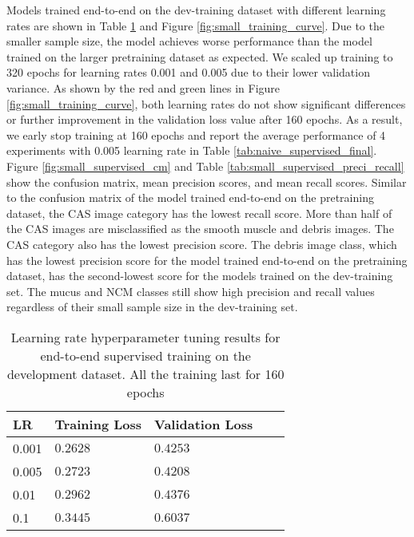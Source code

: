\documentclass[12pt,twoside]{report}
\begin{document}
Models trained end-to-end on the dev-training dataset with different learning rates are shown in Table \ref{tab:small_supervised_tuning} and Figure \ref{fig:small_training_curve}. Due to the smaller sample size, the model achieves worse performance than the model trained on the larger pretraining dataset as expected. We scaled up training to 320 epochs for learning rates 0.001 and 0.005 due to their lower validation variance. As shown by the red and green lines in Figure \ref{fig:small_training_curve}, both learning rates do not show significant differences or further improvement in the validation loss value after 160 epochs. As a result, we early stop training at 160 epochs and report the average performance of 4 experiments with 0.005 learning rate in Table \ref{tab:naive_supervised_final}. \\

Figure \ref{fig:small_supervised_cm} and Table \ref{tab:small_supervised_preci_recall} show the confusion matrix, mean precision scores, and mean recall scores. Similar to the confusion matrix of the model trained end-to-end on the pretraining dataset, the CAS image category has the lowest recall score. More than half of the CAS images are misclassified as the smooth muscle and debris images. The CAS category also has the lowest precision score. The debris image class, which has the lowest precision score for the model trained end-to-end on the pretraining dataset, has the second-lowest score for the models trained on the dev-training set. The mucus and NCM classes still show high precision and recall values regardless of their small sample size in the dev-training set.\\

\begin{table}[]
    \centering
    \begin{tabular}{lllll}
    \toprule
    LR & Training Loss & Validation Loss \\
    \midrule
    0.001 & $0.2628$ & $0.4253$ \\
    0.005 & $0.2723$ & $0.4208$ \\
    0.01  & $0.2962$ & $0.4376$ \\
    0.1   & $0.3445$ & $0.6037$ \\
    \bottomrule
    \end{tabular}
    \caption{Learning rate hyperparameter tuning results for end-to-end supervised training on the development dataset. All the training last for 160 epochs}
    \label{tab:small_supervised_tuning}
\end{table}
\end{document}
